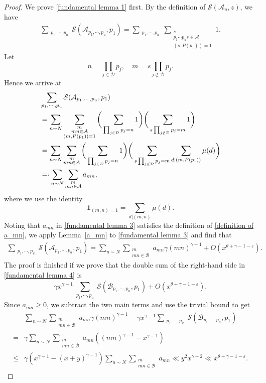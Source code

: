 \documentclass[12pt, reqno, twoside, letterpaper]{amsart}
\numberwithin{equation}{section}
\newcommand{\cA}{\ensuremath{\mathcal{A}}}
\newcommand{\cB}{\ensuremath{\mathcal{B}}}
\newcommand{\cD}{\ensuremath{\mathcal{D}}}
\newcommand{\cS}{\ensuremath{\mathcal{S}}}
\theoremstyle{customthm}
\theoremstyle{customrem}
\newcommand*{\eqdef}{=\mathrel{\vcenter{\baselineskip0.5ex \lineskiplimit0pt
			\hbox{\scriptsize.}\hbox{\scriptsize.}}}%
}
\begin{document}
\begin{proof}
We prove \eqref{fundamental lemma 1} first. By the definition of $\cS(\cA_n,z)$, we have
\begin{align*}
\sum_{\substack{p_1 , \cdots , p_u}} \cS(\cA_{p_1, \cdots, p_u}, p_1) = \sum_{\substack{p_1 , \cdots , p_u}} \sum_{\substack{s \\ p_1\cdots p_u s \in \cA \\ (s, P(p_1))=1}} 1.
\end{align*}
Let 
$$
n = \prod_{j\in \cD} p_j, \quad m = s\prod_{j \notin \cD} p_j.
$$
Hence we arrive at
\begin{align} \label{fundamental lemma 3}
\nonumber
&\sum_{\substack{p_1 , \cdots , p_u}} \cS(\cA_{p_1, \cdots, p_u}, p_1) \\
\nonumber
& = \sum_{n \sim N} \sum_{\substack{m \\ mn \in \cA \\ (m,P(p_1)) = 1}} \bigg( \sum_{\substack{\prod_{j\in \cD} p_j = n}} 1 \bigg) \bigg( \sum_{ s\prod_{j \notin \cD} p_j = m} 1 \bigg) \\
\nonumber
& = \sum_{n \sim N} \sum_{\substack{m \\ mn \in \cA }} \bigg( \sum_{\substack{\prod_{j\in \cD} p_j = n}} 1 \bigg) \bigg( \sum_{ s\prod_{j \notin \cD} p_j = m} \sum_{d|(m,P(p_1))} \mu(d) \bigg)\\
& \eqdef \sum_{n \sim N} \sum_{\substack{m \\ mn \in \cA }} a_{mn},
\end{align}
where we use the identity
$$
\textbf{1}_{(m,n)=1} = \sum_{d|(m,n)} \mu(d) .
$$
Noting that $a_{mn}$ in \eqref{fundamental lemma 3} satisfies the definition of \eqref{definition of a_mn}, we apply Lemma~\ref{a_mn} to \eqref{fundamental lemma 3} and find that
\begin{align}\label{fundamental lemma 4}
\sum_{\substack{p_1 , \cdots , p_u}} \cS(\cA_{p_1, \cdots, p_u}, p_1) = \sum_{n \sim N} \sum_{\substack{m \\ mn \in \cB}} a_{mn} \gamma(mn)^{\gamma-1} + O(x^{\theta + \gamma - 1 -\varepsilon}).
\end{align} 
The proof is finished if we prove that the double sum of the right-hand side in \eqref{fundamental lemma 4} is
$$
\gamma x^{\gamma-1} \sum_{\substack{p_1 , \cdots , p_u}} \cS(\cB_{p_1, \cdots, p_u}, p_1) + O(x^{\theta + \gamma - 1 - \varepsilon}).
$$ 
Since $a_{mn} \geqslant 0$, we subtract the two main terms and use the trivial bound to get
\begin{align*}
\nonumber
&\sum_{n \sim N} \sum_{\substack{m \\ mn \in \cB}} a_{mn} \gamma(mn)^{\gamma-1} - \gamma x^{\gamma-1} \sum_{\substack{p_1 , \cdots , p_u}} \cS(\cB_{p_1, \cdots, p_u}, p_1) \\ 
\nonumber
=&\gamma \sum_{n \sim N} \sum_{\substack{m \\ mn \in \cB}} a_{mn} ((mn)^{\gamma-1}-x^{\gamma-1}) \\
\leqslant&  \gamma ( x^{\gamma-1} - (x+y)^{\gamma-1})\sum_{n \sim N} \sum_{\substack{m \\ mn \in \cB}} a_{mn} \ll y^2x^{\gamma-2} \ll x^{\theta +\gamma -1 - \varepsilon}.
\end{align*} 


\end{proof}
\end{document}
